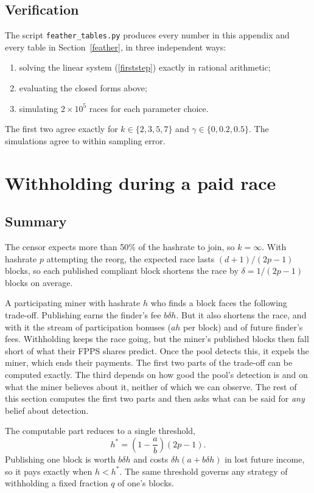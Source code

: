 \documentclass{article}%
\begin{document}
\subsection{Verification}

The script \texttt{feather\_tables.py} produces every number in this appendix
and every table in Section~\ref{feather}, in three independent ways:
\begin{enumerate}
\item solving the linear system (\ref{firststep}) exactly in rational
arithmetic;
\item evaluating the closed forms above;
\item simulating $2\times10^{5}$ races for each parameter choice.
\end{enumerate}
The first two agree exactly for $k\in\{2,3,5,7\}$ and
$\gamma\in\{0,0.2,0.5\}$. The simulations agree to within sampling error.

\section{Withholding during a paid race\label{app:withhold}}

\subsection{Summary}

The censor expects more than 50\% of the hashrate to join, so $k=\infty$. With
hashrate $p$ attempting the reorg, the expected race lasts $(d+1)/(2p-1)$
blocks, so each published compliant block shortens the race by
$\delta=1/(2p-1)$ blocks on average.

A participating miner with hashrate $h$ who finds a block faces the following
trade-off. Publishing earns the finder's fee $b\delta h$. But it also shortens
the race, and with it the stream of participation bonuses ($ah$ per block) and
of future finder's fees. Withholding keeps the race going, but the miner's
published blocks then fall short of what their FPPS shares predict. Once the
pool detects this, it expels the miner, which ends their payments. The first
two parts of the trade-off can be computed exactly. The third depends on how
good the pool's detection is and on what the miner believes about it, neither
of which we can observe. The rest of this section computes the first two parts
and then asks what can be said for \emph{any} belief about detection.

The computable part reduces to a single threshold,
\[
h^{\ast}=\left(  1-\frac{a}{b}\right)  (2p-1).
\]
Publishing one block is worth $b\delta h$ and costs $\delta h(a+b\delta h)$ in
lost future income, so it pays exactly when $h<h^{\ast}$. The same threshold
governs any strategy of withholding a fixed fraction $q$ of one's blocks.
\end{document}
